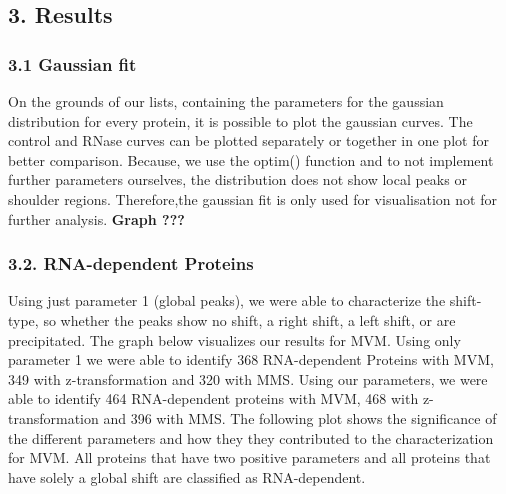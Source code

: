 \documentclass[
  12pt,
]{article}
\begin{document}
\hypertarget{results}{%
\subsection{3. Results}\label{results}}

\hypertarget{gaussian-fit-1}{%
\subsubsection{3.1 Gaussian fit}\label{gaussian-fit-1}}

On the grounds of our lists, containing the parameters for the gaussian
distribution for every protein, it is possible to plot the gaussian
curves. The control and RNase curves can be plotted separately or
together in one plot for better comparison. Because, we use the optim()
function and to not implement further parameters ourselves, the
distribution does not show local peaks or shoulder regions.
Therefore,the gaussian fit is only used for visualisation not for
further analysis. \textbf{Graph ???}

\hypertarget{rna-dependent-proteins}{%
\subsubsection{3.2. RNA-dependent
Proteins}\label{rna-dependent-proteins}}

Using just parameter 1 (global peaks), we were able to characterize the
shift-type, so whether the peaks show no shift, a right shift, a left
shift, or are precipitated. The graph below visualizes our results for
MVM. Using only parameter 1 we were able to identify 368 RNA-dependent
Proteins with MVM, 349 with z-transformation and 320 with MMS. Using our
parameters, we were able to identify 464 RNA-dependent proteins with
MVM, 468 with z-transformation and 396 with MMS. The following plot
shows the significance of the different parameters and how they they
contributed to the characterization for MVM. All proteins that have two
positive parameters and all proteins that have solely a global shift are
classified as RNA-dependent.
\end{document}
